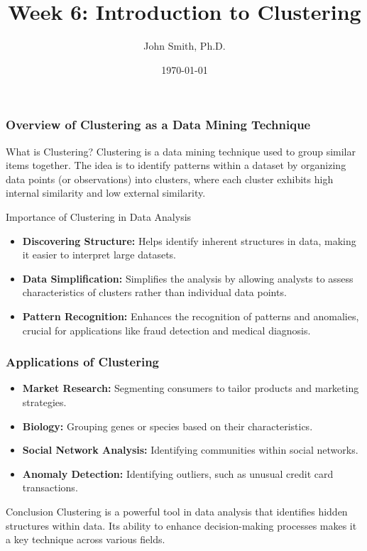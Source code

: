 \documentclass[aspectratio=169]{beamer}
\title[Week 6: Introduction to Clustering]{Week 6: Introduction to Clustering}
\author[J. Smith]{John Smith, Ph.D.}
\institute[University Name]{
  Department of Computer Science\\
  University Name\\
  \vspace{0.3cm}
  Email: email@university.edu\\
  Website: www.university.edu
}
\date{\today}
\begin{document}
\frame{\titlepage}

\begin{frame}[fragile]
    \titlepage
\end{frame}

\begin{frame}[fragile]
    \frametitle{Overview of Clustering as a Data Mining Technique}

    \begin{block}{What is Clustering?}
        Clustering is a data mining technique used to group similar items together. The idea is to identify patterns within a dataset by organizing data points (or observations) into clusters, where each cluster exhibits high internal similarity and low external similarity.
    \end{block}

    \begin{block}{Importance of Clustering in Data Analysis}
        \begin{itemize}
            \item \textbf{Discovering Structure:} Helps identify inherent structures in data, making it easier to interpret large datasets.
            \item \textbf{Data Simplification:} Simplifies the analysis by allowing analysts to assess characteristics of clusters rather than individual data points.
            \item \textbf{Pattern Recognition:} Enhances the recognition of patterns and anomalies, crucial for applications like fraud detection and medical diagnosis.
        \end{itemize}
    \end{block}
\end{frame}

\begin{frame}[fragile]
    \frametitle{Applications of Clustering}

    \begin{itemize}
        \item \textbf{Market Research:} Segmenting consumers to tailor products and marketing strategies.
        \item \textbf{Biology:} Grouping genes or species based on their characteristics.
        \item \textbf{Social Network Analysis:} Identifying communities within social networks.
        \item \textbf{Anomaly Detection:} Identifying outliers, such as unusual credit card transactions.
    \end{itemize}

    \begin{block}{Conclusion}
        Clustering is a powerful tool in data analysis that identifies hidden structures within data. Its ability to enhance decision-making processes makes it a key technique across various fields.
    \end{block}
\end{frame}
\end{document}
